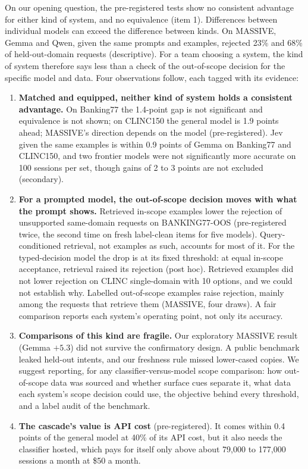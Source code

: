 \documentclass[11pt]{article}
\begin{document}
On our opening question, the pre-registered tests show no consistent advantage for either kind of system, and no equivalence (item 1). Differences between individual models can exceed the difference between kinds. On MASSIVE, Gemma and Qwen, given the same prompts and examples, rejected 23\% and 68\% of held-out-domain requests (descriptive). For a team choosing a system, the kind of system therefore says less than a check of the out-of-scope decision for the specific model and data. Four observations follow, each tagged with its evidence:
\begin{enumerate}
  \item \textbf{Matched and equipped, neither kind of system holds a consistent advantage.} On Banking77 the 1.4-point gap is not significant and equivalence is not shown; on CLINC150 the general model is 1.9 points ahead; MASSIVE's direction depends on the model (pre-registered). Jev given the same examples is within 0.9 points of Gemma on Banking77 and CLINC150, and two frontier models were not significantly more accurate on 100 sessions per set, though gains of 2 to 3 points are not excluded (secondary).
  \item \textbf{For a prompted model, the out-of-scope decision moves with what the prompt shows.} Retrieved in-scope examples lower the rejection of unsupported same-domain requests on BANKING77-OOS (pre-registered twice, the second time on fresh label-clean items for five models). Query-conditioned retrieval, not examples as such, accounts for most of it. For the typed-decision model the drop is at its fixed threshold: at equal in-scope acceptance, retrieval raised its rejection (post hoc). Retrieved examples did not lower rejection on CLINC single-domain with 10 options, and we could not establish why. Labelled out-of-scope examples raise rejection, mainly among the requests that retrieve them (MASSIVE, four draws). A fair comparison reports each system's operating point, not only its accuracy.
  \item \textbf{Comparisons of this kind are fragile.} Our exploratory MASSIVE result (Gemma $+5.3$) did not survive the confirmatory design. A public benchmark leaked held-out intents, and our freshness rule missed lower-cased copies. We suggest reporting, for any classifier-versus-model scope comparison: how out-of-scope data was sourced and whether surface cues separate it, what data each system's scope decision could use, the objective behind every threshold, and a label audit of the benchmark.
  \item \textbf{The cascade's value is API cost} (pre-registered). It comes within 0.4 points of the general model at 40\% of its API cost, but it also needs the classifier hosted, which pays for itself only above about 79,000 to 177,000 sessions a month at \$50 a month.
\end{enumerate}
\end{document}
